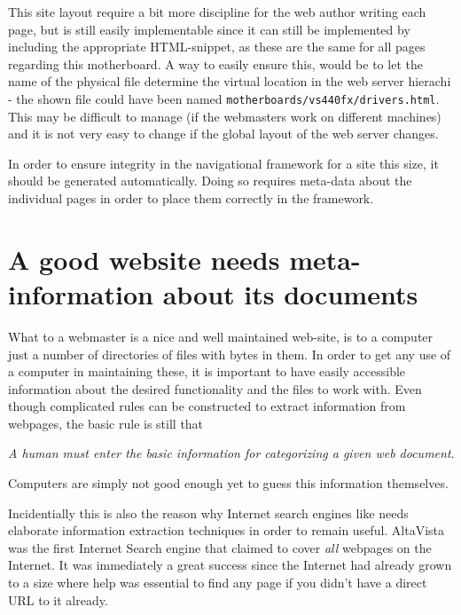 This site layout require a bit more discipline for the web author
writing each page, but is still easily implementable since it can
still be implemented by including the appropriate HTML-snippet, as
these are the same for all pages regarding this motherboard.  A way to
easily ensure this, would be to let the name of the physical file
determine the virtual location in the web server hierachi - the shown
file could have been named
\texttt{motherboards/vs440fx/drivers.html}.  This may be difficult to
manage (if the webmasters work on different machines) and it is not
very easy to change if the global layout of the web server changes.

In order to ensure integrity in the navigational framework for a site
this size, it should be generated automatically.  Doing so requires
meta-data about the individual pages in order to place them correctly
in the framework.

\section{A good website needs meta-information about its documents}

What to a webmaster is a nice and well maintained web-site, is to a
computer just a number of directories of files with bytes in them.  In
order to get any use of a computer in maintaining these, it is
important to have easily accessible information about the desired
functionality and the files to work with.  Even though complicated
rules can be constructed to extract information from webpages, the
basic rule is still that

\begin{center}
  \textit{A human must enter the basic
  information for categorizing a given web document}.
\end{center}

Computers are simply not good enough yet to guess this information
themselves.

Incidentially this is also the reason why Internet search engines like
 needs elaborate
information extraction techniques in order to remain useful.
AltaVista was the first Internet Search engine that claimed to cover
\textit{all} webpages on the Internet.  It was immediately a great
success since the Internet had already grown to a size where help was
essential to find any page if you didn't have a direct URL to it
already.

